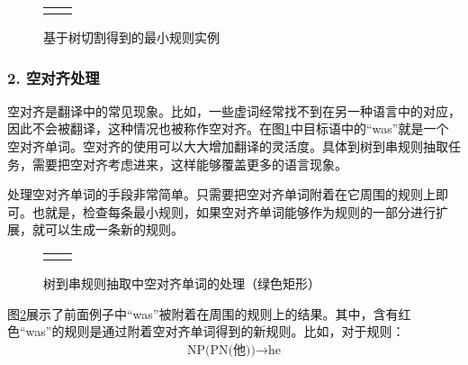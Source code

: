 \begin{figure}[htp]
\centering
\begin{tabular}{l l}
\subfigure{} &  \subfigure{}
\end{tabular}
\caption{基于树切割得到的最小规则实例}
\label{fig:8-27}
\end{figure}


\subsubsection{2. 空对齐处理}

\parinterval 空对齐是翻译中的常见现象。比如，一些虚词经常找不到在另一种语言中的对应，因此不会被翻译，这种情况也被称作空对齐。在图\ref{fig:8-27}中目标语中的“was”就是一个空对齐单词。空对齐的使用可以大大增加翻译的灵活度。具体到树到串规则抽取任务，需要把空对齐考虑进来，这样能够覆盖更多的语言现象。

\parinterval 处理空对齐单词的手段非常简单。只需要把空对齐单词附着在它周围的规则上即可。也就是，检查每条最小规则，如果空对齐单词能够作为规则的一部分进行扩展，就可以生成一条新的规则。

\begin{figure}[htp]
\centering
\begin{tabular}{l l}
\subfigure{} &  \subfigure{}
\end{tabular}
\caption{树到串规则抽取中空对齐单词的处理（绿色矩形）}
\label{fig:8-28}
\end{figure}

\parinterval 图\ref{fig:8-28}展示了前面例子中“was”被附着在周围的规则上的结果。其中，含有红色“was”的规则是通过附着空对齐单词得到的新规则。比如，对于规则：
\begin{eqnarray}
\textrm{NP(PN(他))} \rightarrow \textrm{he} \nonumber
\end{eqnarray}

